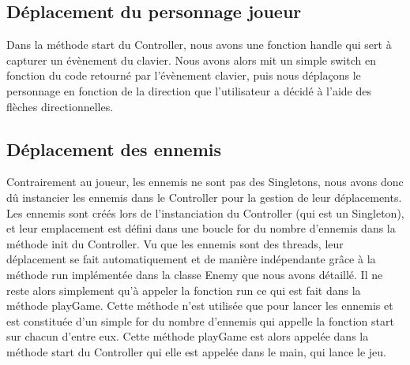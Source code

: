 \documentclass [10pt, a4paper]{article}
\begin{document}
\subsection {Déplacement du personnage joueur}
Dans la méthode start du Controller, nous avons une fonction handle qui sert à capturer un évènement du clavier. Nous avons alors mit un simple switch en fonction du code retourné par l'évènement clavier, puis nous déplaçons le personnage en fonction de la direction que l'utilisateur a décidé à l'aide des flèches directionnelles.

\subsection {Déplacement des ennemis}
Contrairement au joueur, les ennemis ne sont pas des Singletons, nous avons donc dû instancier les ennemis dans le Controller pour la gestion de leur déplacements. Les ennemis sont créés lors de l'instanciation du Controller (qui est un Singleton), et leur emplacement est défini dans une boucle for du nombre d'ennemis dans la méthode init du Controller. Vu que les ennemis sont des threads, leur déplacement se fait automatiquement et de manière indépendante grâce à la méthode run implémentée dans la classe Enemy que nous avons détaillé. Il ne reste alors simplement qu'à appeler la fonction run ce qui est fait dans la méthode playGame. Cette méthode n'est utilisée que pour lancer les ennemis et est constituée d'un simple for du nombre d'ennemis qui appelle la fonction start sur chacun d'entre eux. Cette méthode playGame est alors appelée dans la méthode start du Controller qui elle est appelée dans le main, qui lance le jeu.
\end{document}
